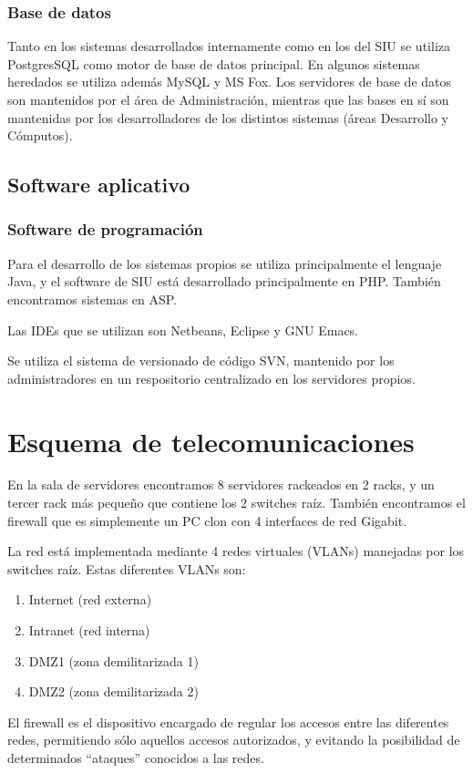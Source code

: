 \documentclass[a4paper,11pt,oneside]{article}
\begin{document}
\subsubsection*{Base de datos}
%
Tanto en los sistemas desarrollados internamente como en los del SIU
se utiliza PostgresSQL como motor de base de datos principal. En
algunos sistemas heredados se utiliza además MySQL y MS Fox.  Los
servidores de base de datos son mantenidos por el área de
Administración, mientras que las bases en sí son mantenidas por los
desarrolladores de los distintos sistemas (áreas Desarrollo y
Cómputos).
%
\subsection*{Software aplicativo}
%
\subsubsection*{Software de programación}
%
Para el desarrollo de los sistemas propios se utiliza principalmente
el lenguaje Java, y el software de SIU está desarrollado
principalmente en PHP. También encontramos sistemas en ASP.

Las IDEs que se utilizan son Netbeans, Eclipse y GNU Emacs.

Se utiliza el sistema de versionado de código SVN, mantenido por los
administradores en un respositorio centralizado en los servidores
propios.
%
\section{Esquema de telecomunicaciones}

En la sala de servidores encontramos 8 servidores rackeados en 2
racks, y un tercer rack más pequeño que contiene los 2 switches
raíz. También encontramos el firewall que es simplemente un PC clon
con 4 interfaces de red Gigabit.

La red está implementada mediante 4 redes virtuales (VLANs) manejadas por
los switches raíz. Estas diferentes VLANs son:
\begin{enumerate}
\item Internet (red externa)
\item Intranet (red interna)
\item DMZ1 (zona demilitarizada 1)
\item DMZ2 (zona demilitarizada 2)
\end{enumerate}

El firewall es el dispositivo encargado de regular los accesos entre
las diferentes redes, permitiendo sólo aquellos accesos autorizados, y
evitando la posibilidad de determinados ``ataques'' conocidos a las
redes.
\end{document}
